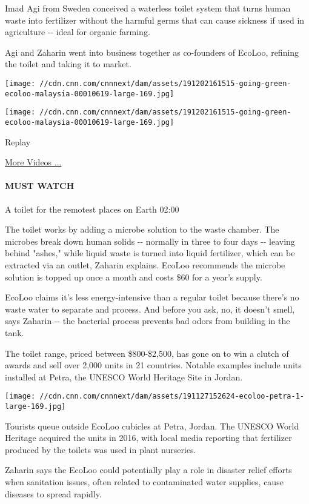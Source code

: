 Imad Agi from Sweden conceived a waterless toilet system that turns
human waste into fertilizer without the harmful germs that can cause
sickness if used in agriculture -\/- ideal for organic farming.

Agi and Zaharin went into business together as co-founders of EcoLoo,
refining the toilet and taking it to market.

\texttt{[image: //cdn.cnn.com/cnnnext/dam/assets/191202161515-going-green-ecoloo-malaysia-00010619-large-169.jpg]}

\texttt{[image: //cdn.cnn.com/cnnnext/dam/assets/191202161515-going-green-ecoloo-malaysia-00010619-large-169.jpg]}\href{javascript:void(0);}{}

Replay

\href{/videos}{More Videos ...}

\hypertarget{must-watch}{%
\paragraph{MUST WATCH}\label{must-watch}}

A toilet for the remotest places on Earth 02:00

The toilet works by adding a microbe solution to the waste chamber. The
microbes break down human solids -\/- normally in three to four days
-\/- leaving behind "ashes," while liquid waste is turned into liquid
fertilizer, which can be extracted via an outlet, Zaharin explains.
EcoLoo recommends the microbe solution is topped up once a month and
costs \$60 for a year's supply.

EcoLoo claims it's less energy-intensive than a regular toilet because
there's no waste water to separate and process. And before you ask, no,
it doesn't smell, says Zaharin -\/- the bacterial process prevents bad
odors from building in the tank.

The toilet range, priced between \$800-\$2,500, has gone on to win a
clutch of awards and sell over 2,000 units in 21 countries. Notable
examples include units installed at Petra, the UNESCO World Heritage
Site in Jordan.

\texttt{[image: //cdn.cnn.com/cnnnext/dam/assets/191127152624-ecoloo-petra-1-large-169.jpg]}

Tourists queue outside EcoLoo cubicles at Petra, Jordan. The UNESCO
World Heritage acquired the units in 2016, with local media reporting
that fertilizer produced by the toilets was used in plant nurseries.

Zaharin says the EcoLoo could potentially play a role in disaster relief
efforts when sanitation issues, often related to contaminated water
supplies, cause diseases to spread rapidly.

